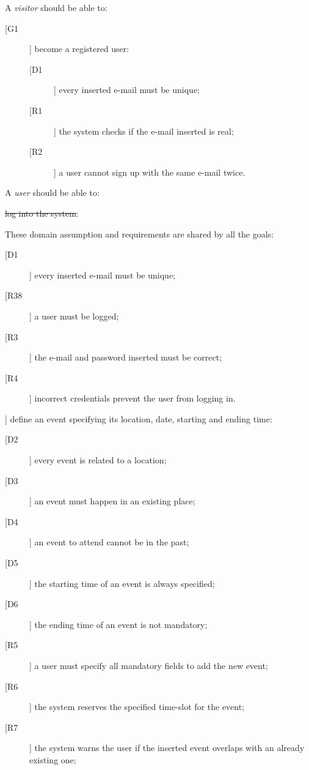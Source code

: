 A \textit{visitor} should be able to:
\begin{description}
\item[[G1]] become a registered user:
	\begin{description}
	\item[[D1]] every inserted e-mail must be unique;
	\newline
	\item[[R1]] the system checks if the e-mail inserted is real;
	\item[[R2]] a user cannot sign up with the same e-mail twice.
	\end{description}
\end{description}

\noindent A \textit{user} should be able to:
\begin{description}
\item[\sout{[G2]}] \sout{log into the system}:\\
\item These domain assumption and requirements are shared by all the goals:
	\begin{description}
	\item[[D1]] every inserted e-mail must be unique;
	\newline
	\item[[R38]] a user must be logged;
	\item[[R3]] the e-mail and password inserted must be correct;
	\item[[R4]] incorrect credentials prevent the user from logging in.
	\end{description}
\item[[G3]] define an event specifying its location, date, starting and ending time:
	\begin{description}
	\item[[D2]] every event is related to a location;
	\item[[D3]] an event must happen in an existing place;
	\item[[D4]] an event to attend cannot be in the past;
	\item[[D5]] the starting time of an event is always specified;
	\item[[D6]] the ending time of an event is not mandatory;
	\newline
	\item[[R5]] a user must specify all mandatory fields to add the new event;
	\item[[R6]] the system reserves the specified time-slot for the event;
	\item[[R7]] the system warns the user if the inserted event overlaps with an already existing one;

\end{description}
\end{description}
